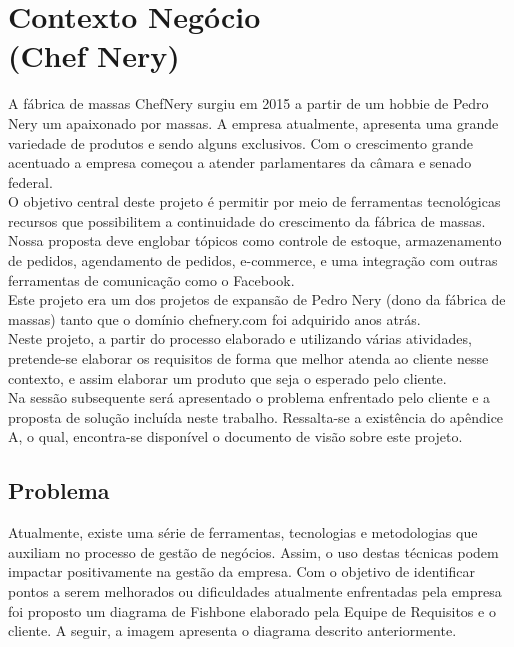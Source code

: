 
\chapter[Contexto do Negócio]{Contexto Negócio \\ (Chef Nery)}
A  fábrica de massas ChefNery surgiu em 2015 a partir de um hobbie de Pedro Nery um apaixonado por massas.  A empresa atualmente, apresenta uma grande variedade de produtos e sendo alguns exclusivos. Com o crescimento grande acentuado a empresa começou a atender parlamentares da câmara e senado federal.\\
\tab O objetivo central deste projeto é permitir por meio de ferramentas tecnológicas recursos que possibilitem a continuidade do crescimento da fábrica de massas. Nossa proposta deve englobar tópicos como controle de estoque, armazenamento de pedidos, agendamento de pedidos, e-commerce, e uma integração com outras ferramentas de comunicação como o Facebook.\\
\tab Este projeto era um dos projetos de expansão de Pedro Nery (dono da fábrica de massas) tanto que o domínio chefnery.com foi adquirido anos atrás.\\
\tab Neste projeto, a partir do processo elaborado e utilizando várias atividades, pretende-se elaborar os requisitos de forma que melhor atenda ao cliente nesse contexto, e assim elaborar um produto que seja o esperado pelo cliente. \\
\tab Na sessão subsequente será apresentado o problema enfrentado pelo cliente e a proposta de solução incluída neste trabalho. Ressalta-se a existência do apêndice A, o qual, encontra-se disponível o documento de visão sobre este projeto. \\


{\large {\section { Problema \\ } } }

Atualmente, existe uma série de ferramentas, tecnologias e metodologias que auxiliam no processo de gestão de negócios.  Assim, o uso destas técnicas podem impactar positivamente na gestão da empresa. Com o objetivo de identificar  pontos a serem melhorados ou dificuldades atualmente enfrentadas pela empresa foi proposto um diagrama de Fishbone elaborado pela Equipe de Requisitos e o cliente. A seguir, a imagem apresenta o diagrama descrito anteriormente.\\

